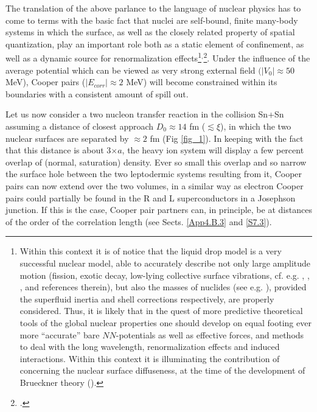 The translation of the above parlance to the language of nuclear physics has to come to terms with the basic fact that nuclei are self-bound, finite many-body systems in which the surface, as well as the closely related property of spatial quantization, play an important role both as a static element of confinement, as well as a dynamic source for renormalization effects\footnote{Within this context it is of notice that the liquid drop model is a very successful nuclear model, able to accurately describe not only large amplitude motion (fission, exotic decay, low-lying collective  surface vibrations, cf. e.g. \cite{Bohr:39}, \cite{Bertsch:88b}, \cite{Barranco:90}, and references therein), but also the masses of nuclides (see e.g. \cite{Moller:95}), provided the superfluid inertia and shell corrections respectively, are properly considered. Thus, it is likely that in the quest of  more predictive theoretical tools of the global nuclear properties one should develop on equal footing ever more ``accurate'' bare $NN$-potentials as well as effective forces, and methods to deal with the long wavelength, renormalization effects and induced interactions. Within this context it is illuminating the contribution of \cite{Anderson:62} concerning the nuclear surface diffuseness, at the time of the development of  Brueckner theory (\cite{Brueckner:61}).}$^,$\footnote{\cite{Broglia:02d}.}.
Under the influence of the average potential which can be viewed as very strong external field $(|V_0|\approx 50$ MeV), Cooper pairs ($|E_{corr}|\approx 2$ MeV) will become constrained within its boundaries with a consistent  amount of spill out. 


Let us now consider a two nucleon transfer reaction in the collision Sn+Sn assuming a distance of closest approach  $D_0\approx 14$ fm ($\lesssim\xi$), in which the two nuclear surfaces are separated by $\approx 2$ fm (Fig \ref{fig_1}). In keeping with the fact that this distance is about 3$\times a$, the heavy ion system will display a few percent overlap of (normal, saturation) density. Ever so small this overlap and so narrow the surface hole between the two leptodermic systems resulting from  it,  Cooper pairs can now extend over the two volumes, in a similar way as electron Cooper pairs could  partially be found in the R and L superconductors in a Josephson junction. If this is the case, Cooper pair partners can, in principle, be at distances of the order of the  correlation length (see Sects. \ref{App4.B.3} and \ref{S7.3}). 

